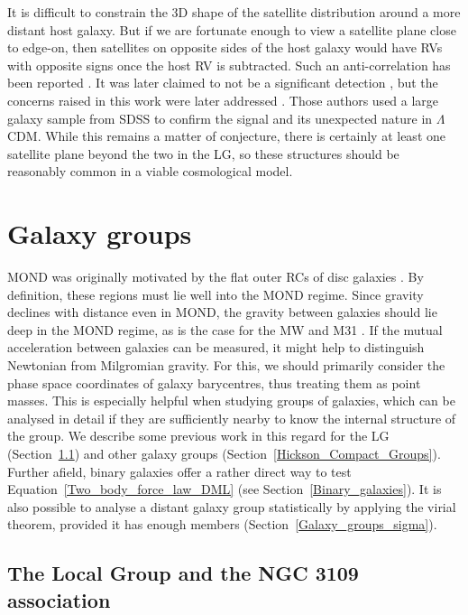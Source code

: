 \documentclass[fleqn,usenatbib,useAMS]{mnras} %
\begin{document}
It is difficult to constrain the 3D shape of the satellite distribution around a more distant host galaxy. But if we are fortunate enough to view a satellite plane close to edge-on, then satellites on opposite sides of the host galaxy would have RVs with opposite signs once the host RV is subtracted. Such an anti-correlation has been reported \citep{Ibata_2014_velocity_anti_correlation}. It was later claimed to not be a significant detection \citep{Cautun_2015_beyond_LG}, but the concerns raised in this work were later addressed \citep{Ibata_2015}. Those authors used a large galaxy sample from SDSS to confirm the signal and its unexpected nature in $\Lambda$CDM. While this remains a matter of conjecture, there is certainly at least one satellite plane beyond the two in the LG, so these structures should be reasonably common in a viable cosmological model.





\section{Galaxy groups}
\label{Galaxy_groups}

MOND was originally motivated by the flat outer RCs of disc galaxies \citep{Milgrom_1983}. By definition, these regions must lie well into the MOND regime. Since gravity declines with distance even in MOND, the gravity between galaxies should lie deep in the MOND regime, as is the case for the MW and M31 \citep{Banik_Ryan_2018}. If the mutual acceleration between galaxies can be measured, it might help to distinguish Newtonian from Milgromian gravity. For this, we should primarily consider the phase space coordinates of galaxy barycentres, thus treating them as point masses. This is especially helpful when studying groups of galaxies, which can be analysed in detail if they are sufficiently nearby to know the internal structure of the group. We describe some previous work in this regard for the LG (Section~\ref{Local_Group}) and other galaxy groups (Section~\ref{Hickson_Compact_Groups}). Further afield, binary galaxies offer a rather direct way to test Equation~\ref{Two_body_force_law_DML} (see Section~\ref{Binary_galaxies}). It is also possible to analyse a distant galaxy group statistically by applying the virial theorem, provided it has enough members (Section~\ref{Galaxy_groups_sigma}).



\subsection{The Local Group and the NGC 3109 association}
\label{Local_Group}
\end{document}
